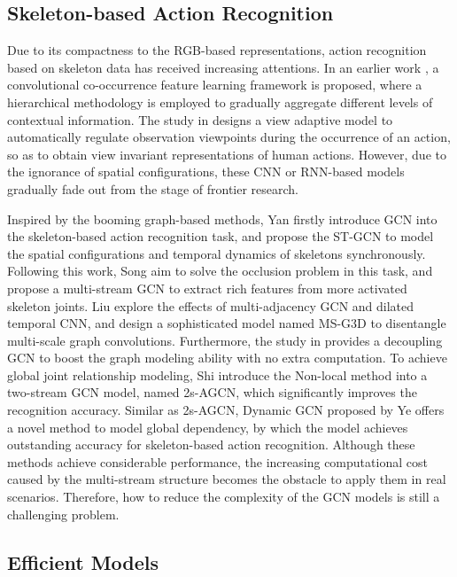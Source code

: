 \documentclass[10pt,journal,compsoc]{IEEEtran}
\begin{document}
\subsection{Skeleton-based Action Recognition}
\label{ssec:related_skeleton}

Due to its compactness to the RGB-based representations, action recognition based on skeleton data has received increasing attentions. In an earlier work \cite{li2018co}, a convolutional co-occurrence feature learning framework is proposed, where a hierarchical methodology is employed to gradually aggregate different levels of contextual information. The study in \cite{zhang2019view} designs a view adaptive model to automatically regulate observation viewpoints during the occurrence of an action, so as to obtain view invariant representations of human actions. However, due to the ignorance of spatial configurations, these CNN or RNN-based models gradually fade out from the stage of frontier research.

Inspired by the booming graph-based methods, Yan \etal \cite{yan2018spatial} firstly introduce GCN into the skeleton-based action recognition task, and propose the ST-GCN to model the spatial configurations and temporal dynamics of skeletons synchronously. Following this work, Song \etal \cite{song2019richly,song2020richly} aim to solve the occlusion problem in this task, and propose a multi-stream GCN to extract rich features from more activated skeleton joints. Liu \etal \cite{liu2020disentangling} explore the effects of multi-adjacency GCN and dilated temporal CNN, and design a sophisticated model named MS-G3D to disentangle multi-scale graph convolutions. Furthermore, the study in \cite{cheng2020decoupling} provides a decoupling GCN to boost the graph modeling ability with no extra computation. To achieve global joint relationship modeling, Shi \etal \cite{shi2019two} introduce the Non-local method \cite{wang2018non} into a two-stream GCN model, named 2s-AGCN, which significantly improves the recognition accuracy. Similar as 2s-AGCN, Dynamic GCN proposed by Ye \etal \cite{ye2020dynamic} offers a novel method to model global dependency, by which the model achieves outstanding accuracy for skeleton-based action recognition. Although these methods achieve considerable performance, the increasing computational cost caused by the multi-stream structure becomes the obstacle to apply them in real scenarios. Therefore, how to reduce the complexity of the GCN models is still a challenging problem.

\subsection{Efficient Models}
\label{ssec:related_efficient}
\end{document}
